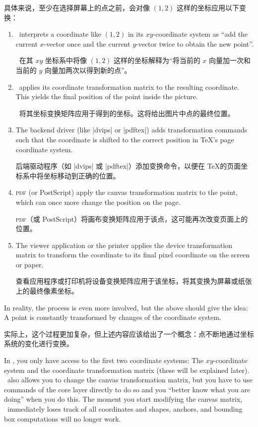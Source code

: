 具体来说，至少在选择屏幕上的点之前，会对像 $(1,2)$ 这样的坐标应用以下变换：%
\begin{enumerate}
    \item \pgfname\ interprets a coordinate like $(1,2)$  in its
        $xy$-coordinate system as ``add the current $x$-vector once and the
        current $y$-vector twice to obtain the new point''.

        \pgfname\ 在其 $xy$ 坐标系中将像 $(1,2)$ 这样的坐标解释为“将当前的 $x$ 向量加一次和当前的 $y$ 向量加两次以得到新的点”。

        \item \pgfname\ applies its coordinate transformation matrix to the
        resulting coordinate. This yields the final position of the point
        inside the picture.

        \pgfname\ 将其坐标变换矩阵应用于得到的坐标。这将给出图片中点的最终位置。

        \item The backend driver (like |dvips| or |pdftex|) adds transformation
        commands such that the coordinate is shifted to the correct position in
        \TeX's page coordinate system.

后端驱动程序（如 |dvips| 或 |pdftex|）添加变换命令，以便在 \TeX 的页面坐标系中将坐标移动到正确的位置。

    \item \textsc{pdf} (or PostScript) apply the canvas transformation matrix
        to the point, which can once more change the position on the page.

        \textsc{pdf}（或 PostScript）将画布变换矩阵应用于该点，这可能再次改变页面上的位置。

        \item The viewer application or the printer applies the device
        transformation matrix to transform the coordinate to its final pixel
        coordinate on the screen or paper.

        查看应用程序或打印机将设备变换矩阵应用于该坐标，将其变换为屏幕或纸张上的最终像素坐标。


    \end{enumerate}

In reality, the process is even more involved, but the above should give the
idea: A point is constantly transformed by changes of the coordinate system.

实际上，这个过程更加复杂，但上述内容应该给出了一个概念：点不断地通过坐标系统的变化进行变换。

In \tikzname, you only have access to the first two coordinate systems: The
$xy$-coordinate system and the coordinate transformation matrix (these will be
explained later). \pgfname\ also allows you to change the canvas transformation
matrix, but you have to use commands of the core layer directly to do so and
you ``better know what you are doing'' when you do this. The moment you start
modifying the canvas matrix, \pgfname\ immediately loses track of all
coordinates and shapes, anchors, and bounding box computations will no longer
work.

